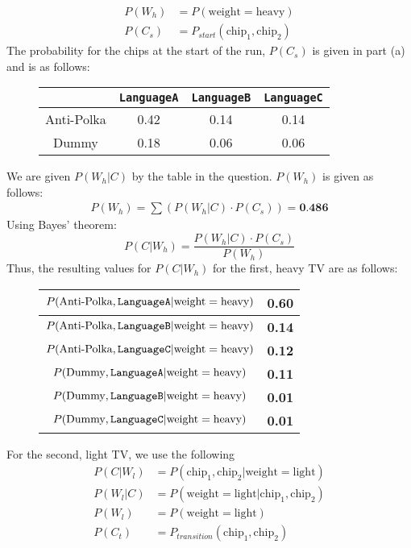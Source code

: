 \documentclass{article}
\begin{document}
\begin{enumerate}[start=0]
\begin{enumerate}
\begin{align*}
    P(W_h) &= P(\text{weight}=\text{heavy})\\
    P(C_s) &= P_{start}(\text{chip}_1, \text{chip}_2)
    \end{align*}
    The probability for the chips at the start of the run, $P(C_s)$ is given in
    part (a) and is as follows:
    \begin{figure}[H]
    \centering
    \begin{tabular}{|c||c|c|c|}
        \hline
        & \texttt{LanguageA} & \texttt{LanguageB} & \texttt{LanguageC}
        \\\hline\hline
        Anti-Polka & 0.42 & 0.14 & 0.14 \\\hline
        Dummy & 0.18 & 0.06 & 0.06 \\\hline
    \end{tabular}
    \end{figure}
    We are given $P(W_h|C)$ by the table in the question. $P(W_h)$ is given as
    follows:
    \begin{align*}
        P(W_h) = \sum{\left( P(W_h|C)\cdot P(C_s)\right)} = \textbf{0.486}
    \end{align*}
    Using Bayes' theorem:
    $$ P(C|W_h) = \frac{P(W_h|C) \cdot P(C_s)}{P(W_h)} $$
    Thus, the resulting values for $P(C|W_h)$ for the first, heavy TV are as follows:
    \begin{figure}[H]
    \centering
    \begin{tabular}{|c||c|}
        \hline
        $P(\text{Anti-Polka},\text{\texttt{LanguageA}}|\text{weight}=\text{heavy})$
        & \textbf{0.60} \\\hline
        $P(\text{Anti-Polka},\text{\texttt{LanguageB}}|\text{weight}=\text{heavy})$
        & \textbf{0.14}\\\hline
        $P(\text{Anti-Polka},\text{\texttt{LanguageC}}|\text{weight}=\text{heavy})$
        & \textbf{0.12}\\\hline
        $P(\text{Dummy},\text{\texttt{LanguageA}}|\text{weight}=\text{heavy})$ &
        \textbf{0.11}\\\hline
        $P(\text{Dummy},\text{\texttt{LanguageB}}|\text{weight}=\text{heavy})$ &
        \textbf{0.01}\\\hline
        $P(\text{Dummy},\text{\texttt{LanguageC}}|\text{weight}=\text{heavy})$ &
        \textbf{0.01}\\\hline
    \end{tabular}
    \end{figure}
    For the second, light TV, we use the following
    \begin{align*}
    P(C|W_l) &= P(\text{chip}_1, \text{chip}_2 | \text{weight} = \text{light})\\
    P(W_l|C) &= P(\text{weight} = \text{light} | \text{chip}_1, \text{chip}_2)\\
    P(W_l) &= P(\text{weight}=\text{light})\\
    P(C_t) &= P_{transition}(\text{chip}_1, \text{chip}_2)
    \end{align*}


\end{enumerate}
\end{enumerate}
\end{document}
